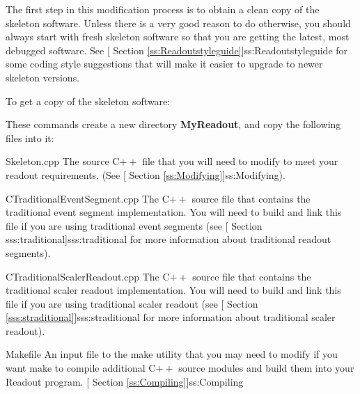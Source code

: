    The first step in this modification process is to obtain a
   clean copy of the skeleton software.   Unless there is a
   very good reason to do otherwise, you should always start
   with fresh skeleton software so that you are getting the
   latest, most debugged software.  See
   [
      Section \ref{ss:Readoutstyleguide}]{ss:Readoutstyleguide} for some
   coding style suggestions that will make it easier to upgrade
   to newer skeleton versions.
   
   To get a copy of the skeleton software:
   \begin{example}
   \computer{$<>$ }
   \computer{$<>$ }
    
   
   \end{example}

   These commands create a new directory {\bf MyReadout}, and
   copy the following files into it:
   \begin{description}
      \item{Skeleton.cpp} The source C$++$ file that you will
	 need to modify to meet your readout requirements.
	 (See 
	 [
	 Section \ref{ss:Modifying}]{ss:Modifying}).
      \item{CTraditionalEventSegment.cpp}  The C$++$ source file that
	  contains the traditional event segment implementation.  You will need
	  to build and link this file if you are using traditional event
	  segments (see  [
	Section {sss:traditional}]{sss:traditional} for more information
	about traditional readout segments).
      \item {CTraditionalScalerReadout.cpp}  The C$++$ source file that
	  contains the traditional scaler readout implementation.  You
	  will need to build and link this file if you are using traditional
	  scaler readout (see [
	 Section \ref{sss:straditional}]{sss:straditional} for more 
	information about traditional scaler readout).
      \item{Makefile}  An input file to the make utility that
	 you may need to modify if you want make to compile
	 additional C$++$ source modules and build them into
	 your Readout program.
	 [
	    Section \ref{ss:Compiling}]{ss:Compiling}
   \end{description}

